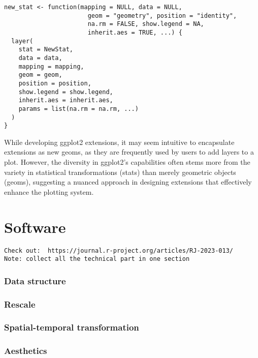 \begin{verbatim}
new_stat <- function(mapping = NULL, data = NULL, 
                       geom = "geometry", position = "identity", 
                       na.rm = FALSE, show.legend = NA, 
                       inherit.aes = TRUE, ...) {
  layer(
    stat = NewStat, 
    data = data, 
    mapping = mapping, 
    geom = geom, 
    position = position, 
    show.legend = show.legend, 
    inherit.aes = inherit.aes, 
    params = list(na.rm = na.rm, ...)
  )
}
\end{verbatim}

While developing ggplot2 extensions, it may seem intuitive to encapsulate extensions as new geoms, as they are frequently used by users to add layers to a plot. However, the diversity in ggplot2's capabilities often stems more from the variety in statistical transformations (stats) than merely geometric objects (geoms), suggesting a nuanced approach in designing extensions that effectively enhance the plotting system.

\hypertarget{software}{%
\section{Software}\label{software}}

\begin{verbatim}
Check out:  https://journal.r-project.org/articles/RJ-2023-013/
Note: collect all the technical part in one section
\end{verbatim}

\hypertarget{data-structure}{%
\subsubsection{Data structure}\label{data-structure}}

\hypertarget{rescale}{%
\subsubsection{Rescale}\label{rescale}}

\hypertarget{spatial-temporal-transformation}{%
\subsubsection{Spatial-temporal transformation}\label{spatial-temporal-transformation}}

\hypertarget{aesthetics}{%
\subsubsection{Aesthetics}\label{aesthetics}}

